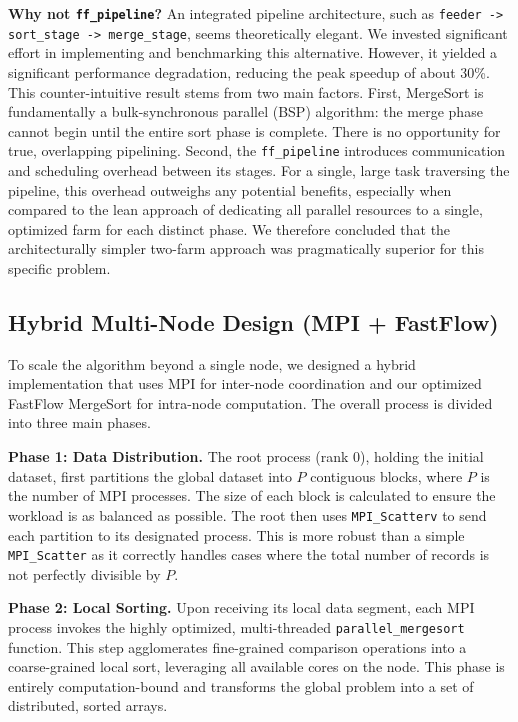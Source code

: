 \documentclass[10pt]{article}
\newcommand{\code}[1]{\texttt{#1}}
\begin{document}
\textbf{Why not \code{ff\_pipeline}?} An integrated pipeline architecture, such as \code{feeder -> sort\_stage -> merge\_stage}, seems theoretically elegant. We invested significant effort in implementing and benchmarking this alternative. However, it yielded a significant performance degradation, reducing the peak speedup of about 30\%. This counter-intuitive result stems from two main factors.
First, MergeSort is fundamentally a bulk-synchronous parallel (BSP) algorithm: the merge phase cannot begin until the entire sort phase is complete. There is no opportunity for true, overlapping pipelining.
Second, the \code{ff\_pipeline} introduces communication and scheduling overhead between its stages. For a single, large task traversing the pipeline, this overhead outweighs any potential benefits, especially when compared to the lean approach of dedicating all parallel resources to a single, optimized farm for each distinct phase. We therefore concluded that the architecturally simpler two-farm approach was pragmatically superior for this specific problem.

\subsection{Hybrid Multi-Node Design (MPI + FastFlow)}
To scale the algorithm beyond a single node, we designed a hybrid implementation that uses MPI for inter-node coordination and our optimized FastFlow MergeSort for intra-node computation. The overall process is divided into three main phases.

\textbf{Phase 1: Data Distribution.} The root process (rank 0), holding the initial dataset, first partitions the global dataset into $P$ contiguous blocks, where $P$ is the number of MPI processes. The size of each block is calculated to ensure the workload is as balanced as possible. The root then uses \code{MPI\_Scatterv} to send each partition to its designated process. This is more robust than a simple \code{MPI\_Scatter} as it correctly handles cases where the total number of records is not perfectly divisible by $P$.

\textbf{Phase 2: Local Sorting.} Upon receiving its local data segment, each MPI process invokes the highly optimized, multi-threaded \code{parallel\_mergesort} function. This step agglomerates fine-grained comparison operations into a coarse-grained local sort, leveraging all available cores on the node. This phase is entirely computation-bound and transforms the global problem into a set of distributed, sorted arrays.
\end{document}
